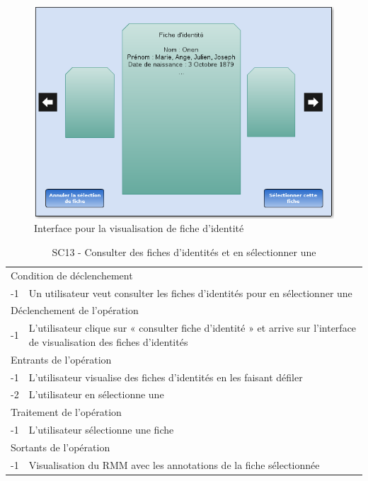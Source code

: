 \documentclass[a4paper]{article}
\begin{document}
\begin{figure}[H]
\centering
\includegraphics[width=\textwidth]{maquette_fiche_identite.png}
\caption{Interface pour la visualisation de fiche d'identité}
\label{fig:fiche_identite}
\end{figure}

\begin{table}[H]
  \centering
   \small
	\begin{tabular}{|c|p{12cm}|}
   		\hline
   			\rowcolor{lightgray}\multicolumn{2}{|c|}{\textbf{SC13 - Consulter des fiches d’identités et en sélectionner une}} \\
   		\hline
   			\multicolumn{2}{|l|}{Condition de d\'eclenchement} \\
   		\hline
   			-1 & Un utilisateur veut consulter les fiches d’identités pour en sélectionner une\\
   		\hline
   			\multicolumn{2}{|l|}{D\'eclenchement de l'op\'eration} \\
   		\hline
   			-1 & L’utilisateur clique sur « consulter fiche d’identité » et arrive sur l'interface de visualisation des fiches d'identités\\
   		\hline
   			\multicolumn{2}{|l|}{Entrants de l'op\'eration} \\
   		\hline
   			-1 & L’utilisateur visualise des fiches d’identités en les faisant défiler\\
			-2 & L'utilisateur en sélectionne une\\
   		\hline
   			\multicolumn{2}{|l|}{Traitement de l'op\'eration} \\
  		\hline
   			-1 & L'utilisateur sélectionne une fiche\\
   		\hline
   			\multicolumn{2}{|l|}{Sortants de l'op\'eration} \\
   		\hline
   			-1 & Visualisation du RMM avec les annotations de la fiche sélectionnée\\
   		\hline
	\end{tabular}
  \caption{SC13 - Consulter des fiches d’identités et en sélectionner une}
  \normalsize
  \label{tab:consulter_fiche}
\end{table}
\end{document}
